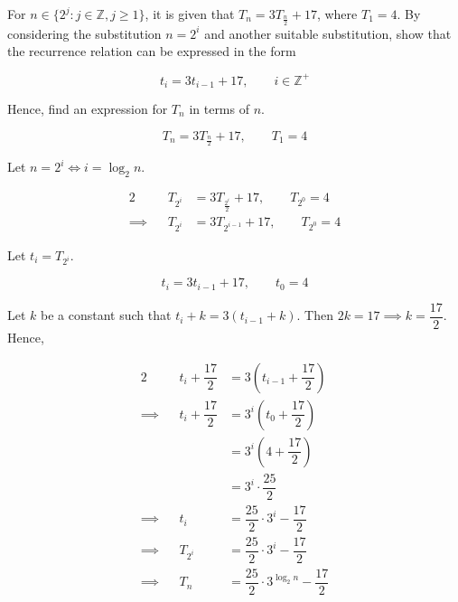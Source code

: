 \documentclass{jhwhw}
\begin{document}
    \problem{}
        For $n \in \{2^j \colon j \in \mathbb{Z}, j \geq 1\}$, it is given that $T_n = 3T_{\tfrac{n}2} + 17$, where $T_1 = 4$. By considering the substitution $n = 2^i$ and another suitable substitution, show that the recurrence relation can be expressed in the form

        \begin{equation*}
            t_i = 3t_{i-1} + 17, \qquad i \in \mathbb{Z}^+
        \end{equation*}

        \noindent Hence, find an expression for $T_n$ in terms of $n$.

    \solution
        \begin{equation*}
            T_n = 3T_{\tfrac{n}2} + 17, \qquad T_1 = 4
        \end{equation*}

        Let $n = 2^i \iff i = \log_2{n}$.

        \begin{alignat*}{2}
            &&T_{2^i} &= 3T_{\tfrac{2^i}2} + 17, \qquad T_{2^0} = 4\\
            \implies&&T_{2^i} &= 3T_{2^{i-1}} + 17, \qquad T_{2^0} = 4
        \end{alignat*}

        Let $t_i = T_{2^i}$.

        \begin{equation*}
            t_i = 3t_{i-1} + 17, \qquad t_0 = 4
        \end{equation*}

        Let $k$ be a constant such that $t_i + k = 3(t_{i-1} + k)$. Then $2k = 17 \implies k = \dfrac{17}2$. Hence,

        \begin{alignat*}{2}
            &&t_i + \dfrac{17}2 &= 3\left(t_{i-1} + \dfrac{17}2\right)\\
            \implies&&t_i + \dfrac{17}2 &= 3^i \left(t_0 + \dfrac{17}2\right)\\
            && &= 3^i \left(4 + \dfrac{17}2\right)\\
            && &= 3^i \cdot \dfrac{25}2\\
            \implies&&t_i &= \dfrac{25}2 \cdot 3^i - \dfrac{17}2\\
            \implies&&T_{2^i} &= \dfrac{25}2 \cdot 3^i - \dfrac{17}2\\
            \implies&&T_n &= \dfrac{25}2 \cdot 3^{\log_2{n}} - \dfrac{17}2
        \end{alignat*}
\end{document}
